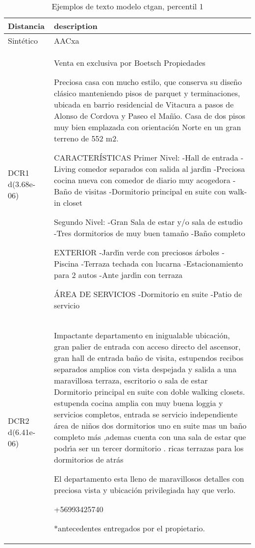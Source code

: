 \begin{table}[H]
\centering
\fontsize{10}{14}\selectfont
\caption{Ejemplos de texto modelo ctgan, percentil 1}
\label{table-example-economicos-a-1-ctgan-1p-text}
\begin{tabular}{|l|m{35em}|}
\hline
\rowcolor[gray]{0.8}
Distancia & description \\
\hline Sintético & AACxa \\
\hline DCR1 d(3.68e-06) & Venta en exclusiva por Boetsch Propiedades

Preciosa casa con mucho estilo, que conserva su dise\~no cl\'asico manteniendo pisos de parquet y terminaciones, ubicada en barrio residencial de Vitacura a pasos de Alonso de Cordova y Paseo el Ma\~n{\'\i}o. Casa de dos pisos muy bien emplazada con orientaci\'on Norte en un gran terreno de 552 m2. 

CARACTER\'ISTICAS
Primer Nivel:
-Hall de entrada 
-Living comedor separados con salida al jard{\'\i}n 
-Preciosa cocina nueva con comedor de diario muy acogedora
-Ba\~no de visitas
-Dormitorio principal en suite con walk-in closet

Segundo Nivel:
-Gran Sala de estar y/o sala de estudio
-Tres dormitorios de muy buen tama\~no
-Ba\~no completo

EXTERIOR
-Jard{\'\i}n verde con preciosos \'arboles
-Piscina 
-Terraza techada con lucarna
-Estacionamiento para 2 autos
-Ante jard{\'\i}n con terraza

\'AREA DE SERVICIOS
-Dormitorio en suite
-Patio de servicio \\
\hline DCR2 d(6.41e-06) & Impactante departamento en inigualable ubicaci\'on,  gran palier de entrada con acceso directo del ascensor, gran hall de entrada ba\~no de visita, estupendos recibos separados  amplios con vista despejada y salida a una maravillosa terraza, escritorio  o sala de estar
Dormitorio principal en suite con doble walking closets.
estupenda cocina amplia con muy buena loggia y servicios completos,  entrada se servicio independiente
\'area de ni\~nos dos dormitorios uno en suite mas un ba\~no completo m\'as ,ademas cuenta  con una sala de estar que podr{\'\i}a ser un tercer dormitorio . 
ricas terrazas para los dormitorios de atr\'as 
 
El departamento esta lleno de maravillosos detalles con preciosa vista y ubicaci\'on privilegiada 
hay que verlo.


+56993425740

*antecedentes entregados por el propietario. \\
\hline
\end{tabular}
\end{table}

